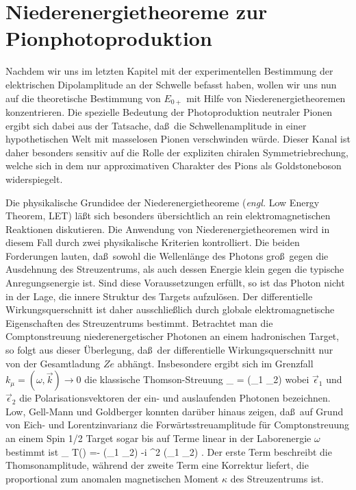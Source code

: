 \chapter{Niederenergietheoreme zur Pionphotoproduktion}
Nachdem wir uns im letzten Kapitel mit der experimentellen 
Bestimmung der elektrischen Dipolamplitude an der Schwelle
befasst haben, wollen wir uns nun auf die theoretische 
Bestimmung von $E_{0+}$ mit Hilfe von Niederenergietheoremen
konzentrieren. Die spezielle Bedeutung der Photoproduktion
neutraler Pionen ergibt sich dabei aus der Tatsache, da\ss\
die Schwellenamplitude in einer hypothetischen Welt
mit masselosen Pionen  verschwinden w\"urde.
Dieser Kanal ist daher besonders sensitiv auf die Rolle der
expliziten chiralen Symmetriebrechung, welche sich in  dem
nur approximativen Charakter des Pions als Goldstoneboson 
widerspiegelt. 

Die physikalische Grundidee der Niederenergietheoreme
({\em engl.} Low Energy Theorem, LET) l\"a\ss t sich besonders
\"ubersichtlich an rein elektromagnetischen Reaktionen
diskutieren. Die Anwendung  von Niederenergietheoremen wird 
in diesem Fall durch zwei physikalische Kriterien kontrolliert. 
Die beiden Forderungen lauten, da\ss\ sowohl 
die Wellenl\"ange des Photons gro\ss\ gegen die  
Ausdehnung des Streuzentrums, als auch dessen 
Energie klein gegen die typische Anregungsenergie ist.
Sind diese Voraussetzungen erf\"ullt, so ist das Photon nicht in der
Lage, die innere Struktur des Targets aufzul\"osen. Der
differentielle Wirkungsquerschnitt ist daher ausschlie\ss lich durch 
globale elektromagnetische Eigenschaften des Streuzentrums bestimmt.
Betrachtet man die Comptonstreuung niederenergetischer
Photonen an einem hadronischen Target, so folgt aus dieser
\"Uberlegung, da\ss\ der differentielle Wirkungsquerschnitt 
nur von der Gesamtladung $Ze$ abh\"angt. Insbesondere ergibt 
sich im Grenzfall $k_\mu=(\omega,\vec{k})\to 0$ die klassische
Thomson-Streuung
\be
\label{thomson}
 \lim_{\omega {}}  =
   (\vec{\epsilon}_1 \cdot\vec{\epsilon}_2)
\ee     
wobei $\vec{\epsilon}_1$ und $\vec{\epsilon}_2$ die 
Polarisationsvektoren der ein- und auslaufenden Photonen
bezeichnen. Low, Gell-Mann und Goldberger \cite{Low54,Low58,GMG54}
konnten dar\"uber hinaus zeigen, da\ss\ auf Grund von 
Eich- und Lorentzinvarianz die Forw\"artsstreuamplitude 
f\"ur Comptonstreuung an einem Spin 1/2 Target sogar bis
auf Terme linear in der Laborenergie $\omega$ bestimmt ist
\be
 \lim_{\omega {}}  T(\omega) =-   
  (\vec{\epsilon}_1 \cdot\vec{\epsilon}_2) -i 
  \kappa^2 \omega  (\vec{\epsilon}_1 \times\vec{\epsilon}_2)
  \cdot \vec{\sigma} \; .
\ee
Der erste Term beschreibt  die Thomsonamplitude, w\"ahrend der
zweite Term eine Korrektur liefert, die proportional zum
anomalen magnetischen Moment $\kappa$ des Streuzentrums ist.

